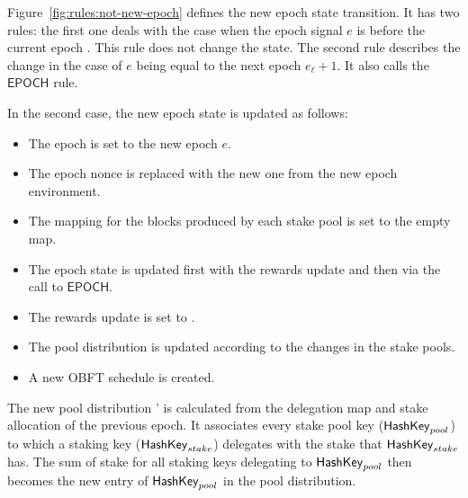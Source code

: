 Figure~\ref{fig:rules:not-new-epoch} defines the new epoch state transition. It
has two rules: the first one deals with the case when the epoch signal $e$ is before the
current epoch . This rule does not change the state. The second rule
describes the change in the case of $e$ being equal to the next epoch
$e_\ell+ 1$. It also calls the $\mathsf{EPOCH}$ rule.

In the second case, the new epoch state is updated as follows:

\begin{itemize}
\item The epoch is set to the new epoch $e$.
\item The epoch nonce is replaced with the new one from the new epoch
  environment.
\item The mapping for the blocks produced by each stake pool is set to the empty
  map.
\item The epoch state is updated first with the rewards update  and then
  via the call to $\mathsf{EPOCH}$.
\item The rewards update is set to \Nothing.
\item The pool distribution is updated according to the changes in the stake pools.
\item A new OBFT schedule is created.
\end{itemize}

The new pool distribution ' is calculated from the delegation map and
stake allocation of the previous epoch. It associates every stake pool key
($\mathsf{HashKey}_{pool}$) to which a staking key ($\mathsf{HashKey}_{stake}$) delegates with
the stake that $\mathsf{HashKey}_{stake}$ has. The sum of stake for all staking keys
delegating to $\mathsf{HashKey}_{pool}$ then becomes the new entry of $\mathsf{HashKey}_{pool}$
in the pool distribution.

